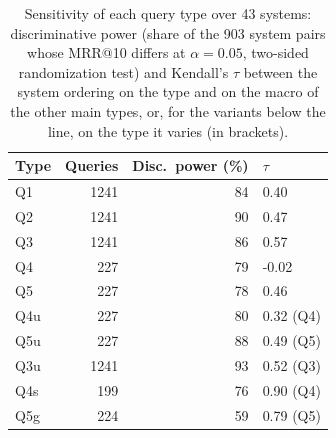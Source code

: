 \begin{table}[t]
\centering\small
\caption{Sensitivity of each query type over 43 systems: discriminative power (share of the
903 system pairs whose MRR@10 differs at $\alpha=0.05$, two-sided randomization test) and Kendall's
$\tau$ between the system ordering on the type and on the macro of the other main types, or, for the variants
below the line, on the type it varies (in brackets).}
\label{tab:validity}
\begin{tabular}{lrrl}
\toprule
Type & Queries & Disc.\ power (\%) & $\tau$ \\
\midrule
Q1 & 1241 & 84 & 0.40 \\
Q2 & 1241 & 90 & 0.47 \\
Q3 & 1241 & 86 & 0.57 \\
Q4 & 227 & 79 & -0.02 \\
Q5 & 227 & 78 & 0.46 \\
\midrule
Q4u & 227 & 80 & 0.32 (Q4) \\
Q5u & 227 & 88 & 0.49 (Q5) \\
Q3u & 1241 & 93 & 0.52 (Q3) \\
Q4s & 199 & 76 & 0.90 (Q4) \\
Q5g & 224 & 59 & 0.79 (Q5) \\
\bottomrule
\end{tabular}
\end{table}
